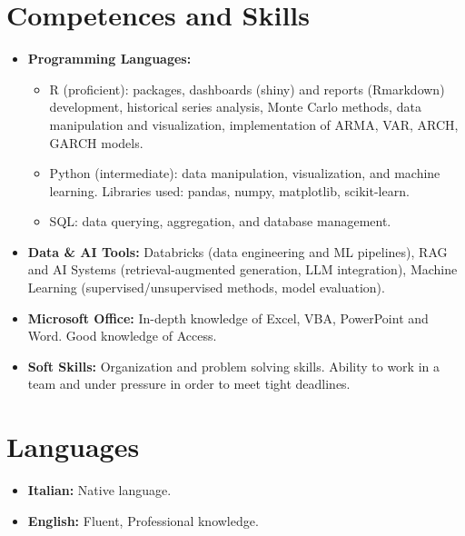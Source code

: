\documentclass[11pt,a4paper,sans]{moderncv}        %
\begin{document}
\section{Competences and Skills}
\begin{itemize}
\item \textbf{Programming Languages:}
\begin{itemize}
    \item R (proficient): packages, dashboards (shiny) and reports (Rmarkdown) development, historical series analysis, Monte Carlo methods, data manipulation and visualization, implementation of ARMA, VAR, ARCH, GARCH models. 
    \item Python (intermediate): data manipulation, visualization, and machine learning. Libraries used: pandas, numpy, matplotlib, scikit-learn.
    \item SQL: data querying, aggregation, and database management.

\end{itemize}
\vspace{1pt}

\item \textbf{Data \& AI Tools:} Databricks (data engineering and ML pipelines), RAG and AI Systems (retrieval-augmented generation, LLM integration), Machine Learning (supervised/unsupervised methods, model evaluation).

\item \textbf{Microsoft Office:} In-depth knowledge of Excel, VBA, PowerPoint and Word. Good knowledge of Access.

\item \textbf{Soft Skills:} Organization and problem solving skills. Ability to work in a team and under pressure in order to meet tight deadlines.

\end{itemize}

\vspace{1}

\section{Languages}

\vspace{1pt}
\begin{itemize}
\item \textbf{Italian:} Native language.

\vspace{1pt}

\item \textbf{English:} Fluent, Professional knowledge.

\vspace{1pt}

\end{itemize}
\end{document}
